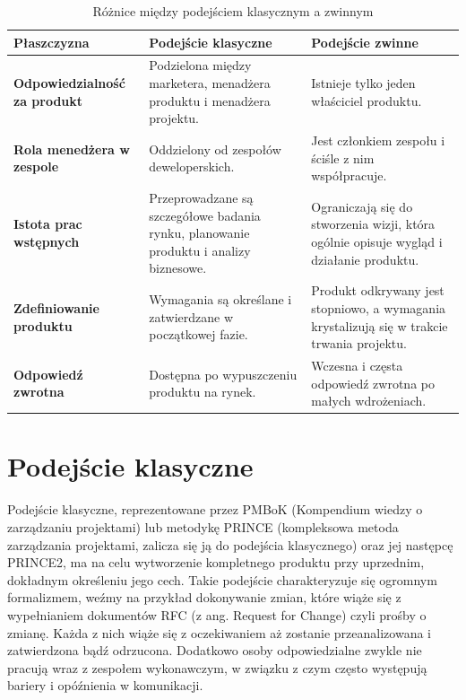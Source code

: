 \begin{table}
\centering\caption{Różnice między podejściem klasycznym a zwinnym\label{tabela:roznice}}
\begin{tabular}{ p{} p{}  p{} }%
\toprule
\textbf{Płaszczyzna} &\textbf{ Podejście klasyczne} & \textbf{Podejście zwinne} \\
\midrule
\textbf{Odpowiedzialność za produkt}
 & Podzielona między marketera, menadżera produktu i menadżera projektu.
 & Istnieje tylko jeden właściciel produktu. \\
\midrule
\textbf{Rola menedżera w zespole}
& Oddzielony od zespołów deweloperskich.
& Jest członkiem zespołu i ściśle z nim współpracuje.\\
\midrule
\textbf{Istota prac wstępnych}
& Przeprowadzane są szczegółowe badania rynku, planowanie produktu i analizy biznesowe.
& Ograniczają się do stworzenia wizji, która ogólnie opisuje wygląd i działanie produktu.\\
\midrule
\textbf{Zdefiniowanie produktu}
& Wymagania są określane i zatwierdzane w początkowej fazie.
& Produkt odkrywany jest stopniowo, a wymagania krystalizują się w trakcie trwania projektu.\\
\midrule
\textbf{Odpowiedź zwrotna}
& Dostępna po wypuszczeniu produktu na rynek.
& Wczesna i częsta odpowiedź zwrotna po małych wdrożeniach.\\
\bottomrule
\end{tabular}
\end{table}
\newpage

\section{Podejście klasyczne}

Podejście klasyczne, reprezentowane przez PMBoK (Kompendium wiedzy o zarządzaniu projektami) lub metodykę PRINCE
(kompleksowa metoda zarządzania projektami, zalicza się ją do podejścia klasycznego) oraz jej następcę PRINCE2,
ma na celu wytworzenie kompletnego produktu przy uprzednim, dokładnym określeniu jego cech.
Takie podejście charakteryzuje się ogromnym formalizmem, weźmy na przykład dokonywanie zmian,
które wiąże się z wypełnianiem dokumentów RFC (z ang. Request for Change) czyli prośby o zmianę.
Każda z nich wiąże się z oczekiwaniem aż zostanie przeanalizowana i zatwierdzona bądź odrzucona.
Dodatkowo osoby odpowiedzialne zwykle nie pracują wraz z zespołem wykonawczym,
w związku z czym często występują bariery i opóźnienia w komunikacji.
~\cite{www_tradycyjne_projekty}

